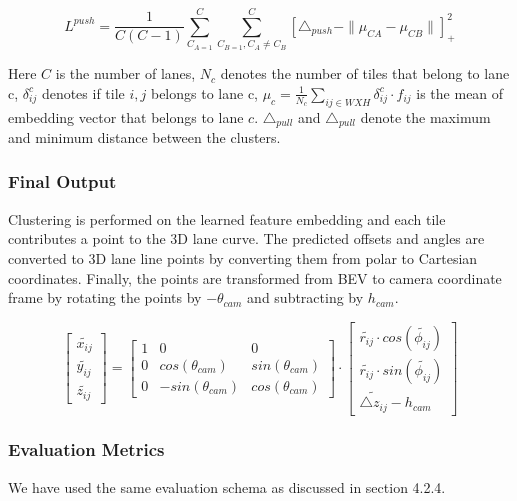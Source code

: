              \begin{equation}
                 L^{push} =  \frac{1}{C(C -1)} \sum^{C}_{C_{A=1} } \sum^{C}_{C_{B=1}, C_{A} \not =C_{B}}[ \triangle_{push} - \parallel \mu_{CA} - \mu_{CB}\parallel ]_{+}^{2}
             \end{equation}
            
            Here $C$ is the number of lanes, $N_{c}$ denotes the number of tiles that belong to lane c, $\delta_{ij}^{c}$ denotes if tile $i,j$ belongs to lane c, $\mu_{c} = \frac{1}{N_{c}} \sum_{ij \in WXH } \delta^{c}_{ij} \cdot f_{ij}$ is the mean of embedding vector that belongs to lane $c$. $\triangle_{pull}$ and $\triangle_{pull}$ denote the maximum and minimum distance between the clusters. 
            
        \subsubsection{Final Output}
        
        Clustering is performed on the learned feature embedding and each tile contributes a point to the 3D lane curve. The predicted offsets and angles are converted to 3D lane line points by converting them from polar to Cartesian coordinates. Finally, the points are transformed from BEV to camera coordinate frame by rotating the points by  $-\theta_{cam}$ and subtracting by $h_{cam}$. 
        
        \begin{equation}
            \begin{bmatrix}\widetilde{x_{ij}}  \\\widetilde{y_{ij}} \\ \widetilde{z_{ij}}  \end{bmatrix} = \begin{bmatrix}1 & 0 & 0  \\ 0  & cos(\theta_{cam}) & sin(\theta_{cam}) \\ 0  & -sin(\theta_{cam}) & cos(\theta_{cam}) \end{bmatrix} \cdot \begin{bmatrix}\widetilde{r_{ij}} \cdot cos(\widetilde{\phi_{ij}})  \\\widetilde{r_{ij}} \cdot sin(\widetilde{\phi_{ij}})  \\ \widetilde{\triangle z_{ij}} - h_{cam} \end{bmatrix}
        \end{equation}
        

        \subsubsection{Evaluation Metrics}
        We have used the same evaluation schema as discussed in section 4.2.4. 
        
